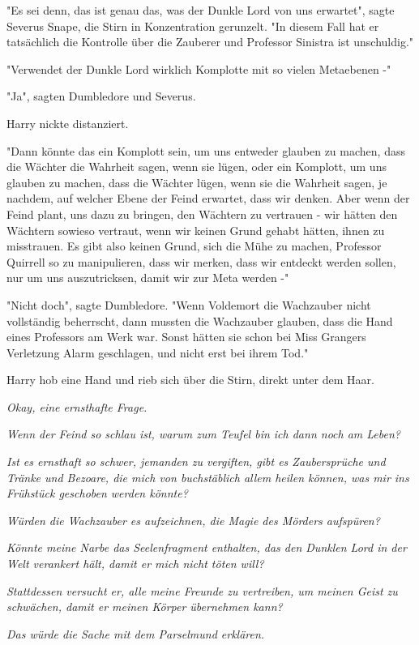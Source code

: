{"Es sei denn, das ist genau das, was der Dunkle Lord von uns erwartet", sagte Severus Snape, die Stirn in Konzentration gerunzelt. "In diesem Fall hat er tatsächlich die Kontrolle über die Zauberer und Professor Sinistra ist unschuldig."

"Verwendet der Dunkle Lord wirklich Komplotte mit so vielen Metaebenen -"

"Ja", sagten Dumbledore und Severus.

Harry nickte distanziert.

"Dann könnte das ein Komplott sein, um uns entweder glauben zu machen, dass die Wächter die Wahrheit sagen, wenn sie lügen, oder ein Komplott, um uns glauben zu machen, dass die Wächter lügen, wenn sie die Wahrheit sagen, je nachdem, auf welcher Ebene der Feind erwartet, dass wir denken. Aber wenn der Feind plant, uns dazu zu bringen, den Wächtern zu vertrauen - wir hätten den Wächtern sowieso vertraut, wenn wir keinen Grund gehabt hätten, ihnen zu misstrauen. Es gibt also keinen Grund, sich die Mühe zu machen, Professor Quirrell so zu manipulieren, dass wir merken, dass wir entdeckt werden sollen, nur um uns auszutricksen, damit wir zur Meta werden -"

"Nicht doch", sagte Dumbledore. "Wenn Voldemort die Wachzauber nicht vollständig beherrscht, dann mussten die Wachzauber glauben, dass die Hand eines Professors am Werk war. Sonst hätten sie schon bei Miss Grangers Verletzung Alarm geschlagen, und nicht erst bei ihrem Tod."

Harry hob eine Hand und rieb sich über die Stirn, direkt unter dem Haar.

\emph{Okay, eine ernsthafte Frage.}

\emph{Wenn der Feind so schlau ist, warum zum Teufel bin ich dann noch am Leben?}

\emph{Ist es ernsthaft so schwer, jemanden zu vergiften, gibt es Zaubersprüche und Tränke und Bezoare, die mich von buchstäblich allem heilen können, was mir ins Frühstück geschoben werden könnte?}

\emph{Würden die Wachzauber es aufzeichnen, die Magie des Mörders aufspüren?}

\emph{Könnte meine Narbe das Seelenfragment enthalten, das den Dunklen Lord in der Welt verankert hält, damit er mich nicht töten will?}

\emph{Stattdessen versucht er, alle meine Freunde zu vertreiben, um meinen Geist zu schwächen, damit er meinen Körper übernehmen kann?}

\emph{Das würde die Sache mit dem Parselmund erklären.}

}
